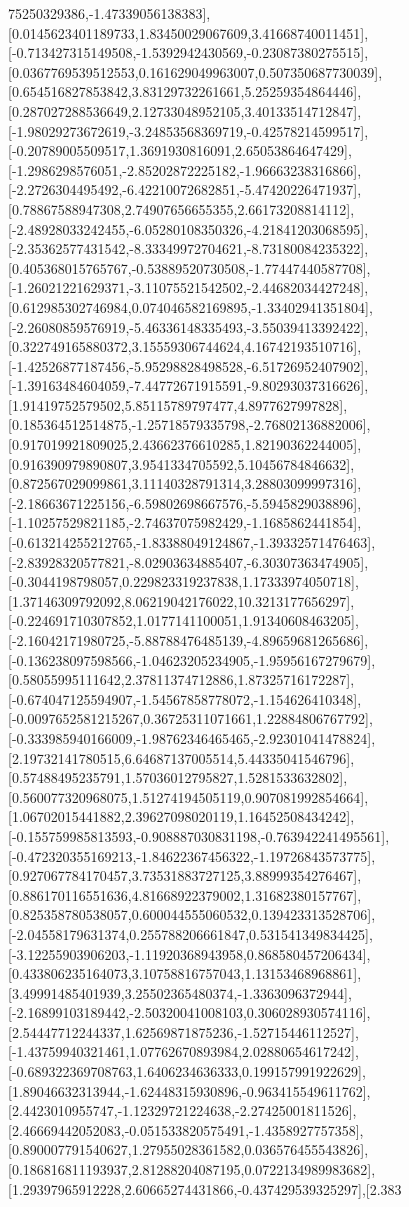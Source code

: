 \documentclass{article}
\begin{document}
75250329386,-1.47339056138383],[0.0145623401189733,1.83450029067609,3.41668740011451],[-0.713427315149508,-1.5392942430569,-0.23087380275515],[0.0367769539512553,0.161629049963007,0.507350687730039],[0.654516827853842,3.83129732261661,5.25259354864446],[0.287027288536649,2.12733048952105,3.40133514712847],[-1.98029273672619,-3.24853568369719,-0.42578214599517],[-0.20789005509517,1.3691930816091,2.65053864647429],[-1.2986298576051,-2.85202872225182,-1.96663238316866],[-2.2726304495492,-6.42210072682851,-5.47420226471937],[0.78867588947308,2.74907656655355,2.66173208814112],[-2.48928033242455,-6.05280108350326,-4.21841203068595],[-2.35362577431542,-8.33349972704621,-8.73180084235322],[0.405368015765767,-0.53889520730508,-1.77447440587708],[-1.26021221629371,-3.11075521542502,-2.44682034427248],[0.612985302746984,0.074046582169895,-1.33402941351804],[-2.26080859576919,-5.46336148335493,-3.55039413392422],[0.322749165880372,3.15559306744624,4.16742193510716],[-1.42526877187456,-5.95298828498528,-6.51726952407902],[-1.39163484604059,-7.44772671915591,-9.80293037316626],[1.91419752579502,5.85115789797477,4.8977627997828],[0.185364512514875,-1.25718579335798,-2.76802136882006],[0.917019921809025,2.43662376610285,1.82190362244005],[0.916390979890807,3.9541334705592,5.10456784846632],[0.872567029099861,3.11140328791314,3.28803099997316],[-2.18663671225156,-6.59802698667576,-5.5945829038896],[-1.10257529821185,-2.74637075982429,-1.1685862441854],[-0.613214255212765,-1.83388049124867,-1.39332571476463],[-2.83928320577821,-8.02903634885407,-6.30307363474905],[-0.3044198798057,0.229823319237838,1.17333974050718],[1.37146309792092,8.06219042176022,10.3213177656297],[-0.224691710307852,1.0177141100051,1.91340608463205],[-2.16042171980725,-5.88788476485139,-4.89659681265686],[-0.136238097598566,-1.04623205234905,-1.95956167279679],[0.58055995111642,2.37811374712886,1.87325716172287],[-0.674047125594907,-1.54567858778072,-1.154626410348],[-0.0097652581215267,0.36725311071661,1.22884806767792],[-0.333985940166009,-1.98762346465465,-2.92301041478824],[2.19732141780515,6.64687137005514,5.44335041546796],[0.57488495235791,1.57036012795827,1.5281533632802],[0.560077320968075,1.51274194505119,0.907081992854664],[1.06702015441882,2.39627098020119,1.16452508434242],[-0.155759985813593,-0.908887030831198,-0.763942241495561],[-0.472320355169213,-1.84622367456322,-1.19726843573775],[0.927067784170457,3.73531883727125,3.88999354276467],[0.886170116551636,4.81668922379002,1.31682380157767],[0.825358780538057,0.600044555060532,0.139423313528706],[-2.04558179631374,0.255788206661847,0.531541349834425],[-3.12255903906203,-1.11920368943958,0.868580457206434],[0.433806235164073,3.10758816757043,1.13153468968861],[3.49991485401939,3.25502365480374,-1.3363096372944],[-2.16899103189442,-2.50320041008103,0.306028930574116],[2.54447712244337,1.62569871875236,-1.52715446112527],[-1.43759940321461,1.07762670893984,2.02880654617242],[-0.689322369708763,1.6406234636333,0.199157991922629],[1.89046632313944,-1.62448315930896,-0.963415549611762],[2.4423010955747,-1.12329721224638,-2.27425001811526],[2.46669442052083,-0.051533820575491,-1.4358927757358],[0.890007791540627,1.27955028361582,0.036576455543826],[0.186816811193937,2.81288204087195,0.0722134989983682],[1.29397965912228,2.60665274431866,-0.437429539325297],[2.383
\end{document}

